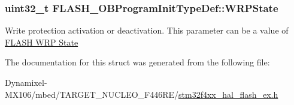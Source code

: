\subsubsection[{\texorpdfstring{W\+R\+P\+State}{WRPState}}]{\setlength{\rightskip}{0pt plus 5cm}uint32\+\_\+t F\+L\+A\+S\+H\+\_\+\+O\+B\+Program\+Init\+Type\+Def\+::\+W\+R\+P\+State}\hypertarget{struct_f_l_a_s_h___o_b_program_init_type_def_a2607ba046f7a3af46e7209b8f1e9e20d}{}\label{struct_f_l_a_s_h___o_b_program_init_type_def_a2607ba046f7a3af46e7209b8f1e9e20d}
Write protection activation or deactivation. This parameter can be a value of \hyperlink{group___f_l_a_s_h_ex___w_r_p___state}{F\+L\+A\+SH W\+RP State} 

The documentation for this struct was generated from the following file\+:\begin{DoxyCompactItemize}
\item 
Dynamixel-\/\+M\+X106/mbed/\+T\+A\+R\+G\+E\+T\+\_\+\+N\+U\+C\+L\+E\+O\+\_\+\+F446\+R\+E/\hyperlink{stm32f4xx__hal__flash__ex_8h}{stm32f4xx\+\_\+hal\+\_\+flash\+\_\+ex.\+h}\end{DoxyCompactItemize}
